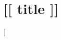 \documentclass[10pt,twocolumn,lettersize]{book}
\begin{document}
\chapter*{[[ title ]]}
[%
\end{document}
